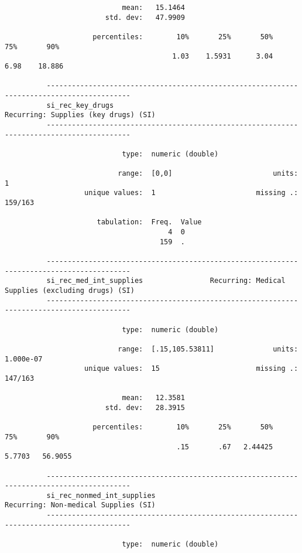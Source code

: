 \documentclass{article}
\begin{document}
\begin{verbatim}
                            mean:   15.1464
                        std. dev:   47.9909
          
                     percentiles:        10%       25%       50%       75%       90%
                                        1.03    1.5931      3.04      6.98    18.886
          
          ------------------------------------------------------------------------------------------
          si_rec_key_drugs                                      Recurring: Supplies (key drugs) (SI)
          ------------------------------------------------------------------------------------------
          
                            type:  numeric (double)
          
                           range:  [0,0]                        units:  1
                   unique values:  1                        missing .:  159/163
          
                      tabulation:  Freq.  Value
                                       4  0
                                     159  .
          
          ------------------------------------------------------------------------------------------
          si_rec_med_int_supplies                Recurring: Medical Supplies (excluding drugs) (SI)
          ------------------------------------------------------------------------------------------
          
                            type:  numeric (double)
          
                           range:  [.15,105.53811]              units:  1.000e-07
                   unique values:  15                       missing .:  147/163
          
                            mean:   12.3581
                        std. dev:   28.3915
          
                     percentiles:        10%       25%       50%       75%       90%
                                         .15       .67   2.44425    5.7703   56.9055
          
          ------------------------------------------------------------------------------------------
          si_rec_nonmed_int_supplies                            Recurring: Non-medical Supplies (SI)
          ------------------------------------------------------------------------------------------
          
                            type:  numeric (double)
          

\end{verbatim}
\end{document}
